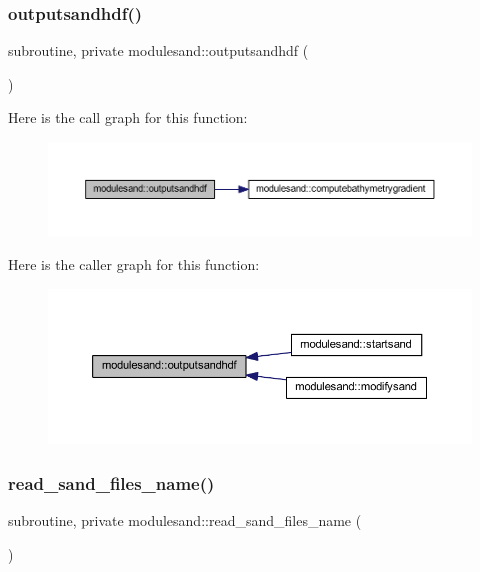 \subsubsection{\texorpdfstring{outputsandhdf()}{outputsandhdf()}}
{\footnotesize\ttfamily subroutine, private modulesand\+::outputsandhdf (\begin{DoxyParamCaption}{ }\end{DoxyParamCaption})\hspace{0.3cm}{\ttfamily [private]}}

Here is the call graph for this function\+:\nopagebreak
\begin{figure}[H]
\begin{center}
\leavevmode
\includegraphics[width=350pt]{namespacemodulesand_af453c334bacf72e34c80ff7d4a71fb1a_cgraph}
\end{center}
\end{figure}
Here is the caller graph for this function\+:\nopagebreak
\begin{figure}[H]
\begin{center}
\leavevmode
\includegraphics[width=350pt]{namespacemodulesand_af453c334bacf72e34c80ff7d4a71fb1a_icgraph}
\end{center}
\end{figure}
\mbox{\label{namespacemodulesand_af5d461af239929ac66d30206f4a6d982}} 
\subsubsection{\texorpdfstring{read\+\_\+sand\+\_\+files\+\_\+name()}{read\_sand\_files\_name()}}
{\footnotesize\ttfamily subroutine, private modulesand\+::read\+\_\+sand\+\_\+files\+\_\+name (\begin{DoxyParamCaption}{ }\end{DoxyParamCaption})\hspace{0.3cm}{\ttfamily [private]}}

